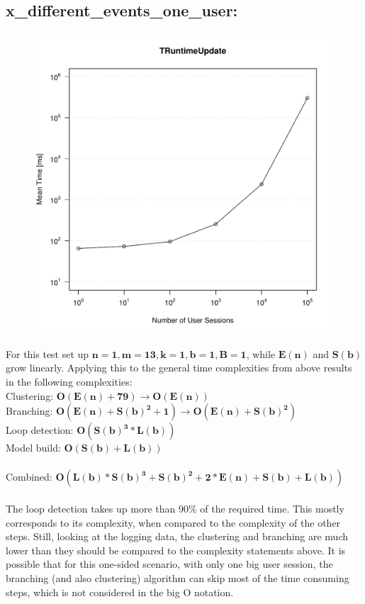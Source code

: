\documentclass[10pt,a4paper]{article}
\begin{document}
\subsection{x\_different\_events\_one\_user:}
\begin{figure}[H]
	\centering
	\includegraphics[scale=0.7]{Grafiken/TRuntimeUpdate_different_events.pdf}
\end{figure}
For this test set up $\mathbf{n = 1, m = 13, k = 1, b = 1, B = 1}$, while $\mathbf{E(n)}$ and $\mathbf{S(b)}$ grow linearly. Applying this to the general time complexities from above results in the following complexities:\\
Clustering: $\mathbf{O(E(n) + 79) \rightarrow O(E(n))}$\\
Branching: $\mathbf{O(E(n) + S(b)^2 + 1) \rightarrow O(E(n) + S(b)^2)}$\\
Loop detection: $\mathbf{O(S(b)^3 * L(b))}$\\
Model build: $\mathbf{O(S(b) + L(b))}$\\
\\
Combined: $\mathbf{O(L(b) * S(b)^3 + S(b)^2 + 2 * E(n) + S(b) + L(b))}$\\
\\
The loop detection takes up more than 90\% of the required time. This mostly corresponds to its complexity, when compared to the complexity of the other steps. Still, looking at the logging data, the clustering and branching are much lower than they should be compared to the complexity statements above. It is possible that for this one-sided scenario, with only one big user session, the branching (and also clustering) algorithm can skip most of the time consuming steps, which is not considered in the big O notation.
\end{document}
